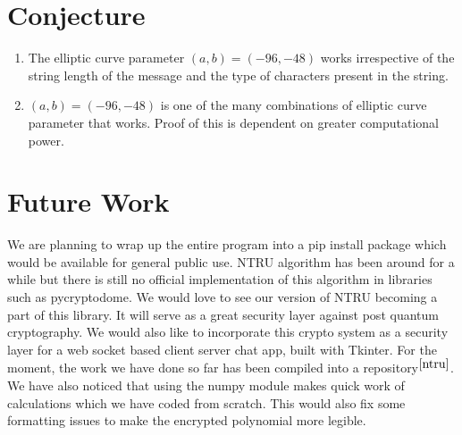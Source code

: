 \documentclass[cryptography,article,submit,moreauthors,pdftex]{Definitions/mdpi}
\begin{document}
\section{Conjecture}
\begin{enumerate}
	\item The elliptic curve parameter $(a,b)=(-96,-48)$ works irrespective of the string length of the message and the type of characters present in the string.
	\item $(a,b)=(-96,-48)$ is one of the many combinations of elliptic curve parameter that works. Proof of this is dependent on greater computational power.
\end{enumerate}

\section{Future Work}
\begin{flushleft}
We are planning to wrap up the entire program into a pip install package which would be available for general public use. NTRU algorithm has been around for a while but there is still no official implementation of this algorithm in libraries such as pycryptodome. We would love to see our version of NTRU becoming a part of this library. It will serve as a great security layer against post quantum cryptography. We would also like to incorporate this crypto system as a security layer for a web socket based client server chat app, built with Tkinter. For the moment, the work we have done so far has been compiled into a repository$^{\cite{ntru}}$. We have also noticed that using the numpy module makes quick work of calculations which we have coded from scratch. This would also fix some formatting issues to make the encrypted polynomial more legible.
\end{flushleft}
\end{document}
